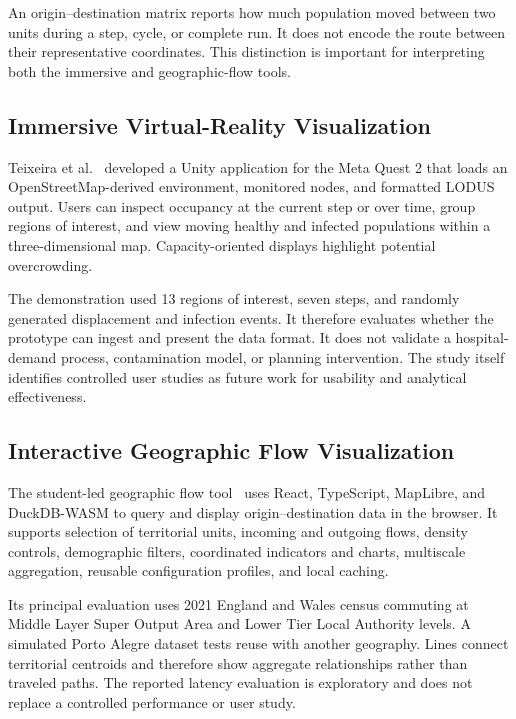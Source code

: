\documentclass[pdflatex,sn-mathphys-num]{sn-jnl}%
\theoremstyle{thmstyleone}%
\theoremstyle{thmstyletwo}%
\theoremstyle{thmstylethree}%
\begin{document}
An origin--destination matrix reports how much population moved between two units during a step, cycle, or complete run. It does not encode the route between their representative coordinates. This distinction is important for interpreting both the immersive and geographic-flow tools.



\subsection{Immersive Virtual-Reality Visualization}
Teixeira et al.~\citep{teixeira2024visualization} developed a Unity application for the Meta Quest 2 that loads an OpenStreetMap-derived environment, monitored nodes, and formatted LODUS output. Users can inspect occupancy at the current step or over time, group regions of interest, and view moving healthy and infected populations within a three-dimensional map. Capacity-oriented displays highlight potential overcrowding.

The demonstration used 13 regions of interest, seven steps, and randomly generated displacement and infection events. It therefore evaluates whether the prototype can ingest and present the data format. It does not validate a hospital-demand process, contamination model, or planning intervention. The study itself identifies controlled user studies as future work for usability and analytical effectiveness.



\subsection{Interactive Geographic Flow Visualization}
The student-led geographic flow tool~\citep{silva2026geospatial} uses React, TypeScript, MapLibre, and DuckDB-WASM to query and display origin--destination data in the browser. It supports selection of territorial units, incoming and outgoing flows, density controls, demographic filters, coordinated indicators and charts, multiscale aggregation, reusable configuration profiles, and local caching.

Its principal evaluation uses 2021 England and Wales census commuting at Middle Layer Super Output Area and Lower Tier Local Authority levels. A simulated Porto Alegre dataset tests reuse with another geography. Lines connect territorial centroids and therefore show aggregate relationships rather than traveled paths. The reported latency evaluation is exploratory and does not replace a controlled performance or user study.
\end{document}
